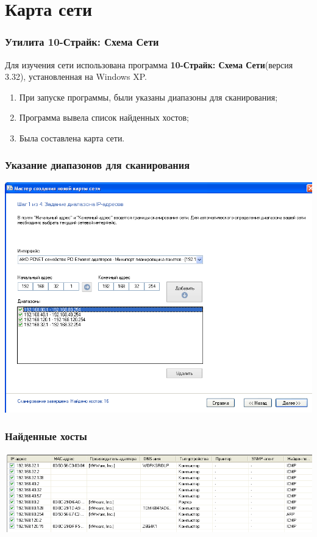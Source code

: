 \documentclass[9pt, compress]{beamer}
\begin{document}
\section{Карта сети}

\begin{frame}[fragile]
\frametitle{Утилита 10-Страйк: Схема Сети}
Для изучения сети использована программа \textbf{10-Страйк: Схема Сети}(версия 3.32), установленная на Windows XP.

\begin{enumerate}
\item При запуске программы, были указаны диапазоны для сканирования;
\item Программа вывела список найденных хостов;
\item Была составлена карта сети.
\end{enumerate}
\end{frame}


\begin{frame}[fragile]
\frametitle{Указание диапазонов для сканирования}
\begin{center}  
	\includegraphics[width=.9\textwidth]{img/1}
\end{center}
\end{frame}

\begin{frame}[fragile]
\frametitle{Найденные хосты}
\begin{center}  
	\includegraphics[width=\textwidth]{img/2}
\end{center}
\end{frame}
\end{document}
